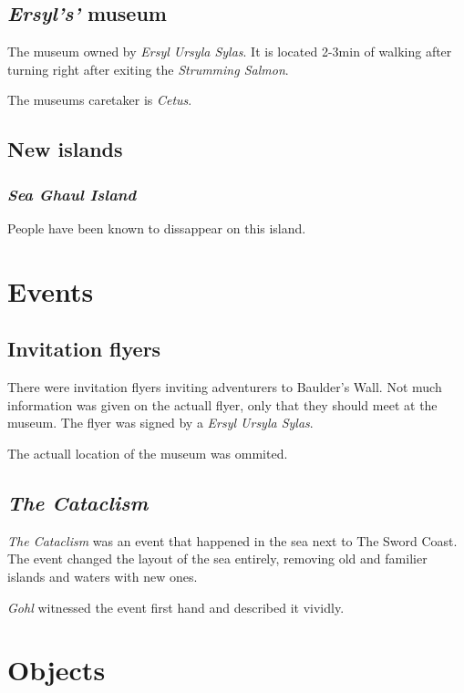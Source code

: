 \documentclass{article}
\begin{document}
\begin{multicols}{2}
    \subsection{ \textit{Ersyl's'} museum}

    The museum owned by \textit{Ersyl Ursyla Sylas}. It is located 2-3min of walking after turning right after exiting the \textit{Strumming Salmon}.

    The museums caretaker is \textit{Cetus}.

    \subsection{New islands}

    \subsubsection{\textit{Sea Ghaul Island}}

    People have been known to dissappear on this island.

    \section{Events}

    \subsection{Invitation flyers}

    There were invitation flyers inviting adventurers to Baulder's Wall. Not much information was given on the actuall flyer, only that they should meet at the museum. The flyer was signed by a
    \textit{Ersyl Ursyla Sylas}.

    The actuall location of the museum was ommited.

    \subsection{\textit{The Cataclism}}

    \textit{The Cataclism} was an event that happened in the sea next to The Sword Coast. The event changed the layout of the sea entirely, removing old and familier islands and waters with new ones.

    \textit{Gohl} witnessed the event first hand and described it vividly.

    \section{Objects}


\end{multicols}
\end{document}
